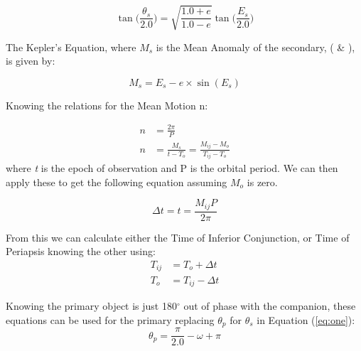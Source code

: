 \documentclass[12pt,preprint]{aastex}
\begin{document}
\begin{equation}
\tan\bigg( \frac{\theta_s}{2.0}  \bigg) = \sqrt{\frac{1.0+e}{1.0-e}} \tan\bigg( \frac{E_s}{2.0} \bigg)
\end{equation}

The Kepler's Equation, where $M_s$ is the Mean Anomaly of the secondary, (\citet{heintz} \& \citet{hilditch}), is given by:

\begin{equation}
M_s = E_s-e\times \sin(E_s)  
\end{equation}

Knowing the relations for the Mean Motion n:

\begin{subequations}
\begin{align}
n &= \frac{2\pi}{P}\\
n &=\frac{M_s}{t-T_o}=\frac{M_{ij}-M_{o}}{T_{ij}-T_o} 
\end{align}
\end{subequations}
where {\it t} is the epoch of observation and P is the orbital period.
We can then apply these to get the following equation assuming $M_{o}$ is zero.

\begin{equation}\label{eq:five}
\Delta t =t = \frac{M_{ij}P}{2\pi}
\end{equation}


From this we can calculate either the Time of Inferior Conjunction, or Time of Periapsis knowing the other using:
\begin{subequations}
\begin{align}
T_{ij} &= T_{o}+\Delta t\\
T_o &= T_{ij}-\Delta t
\end{align}
\end{subequations}



Knowing the primary object is just 180$^{\circ}$ out of phase with the companion, these equations can be used for the primary replacing $\theta_p$ for $\theta_s$ in Equation (\ref{eq:one}):
\begin{equation}
\theta_p = \frac{\pi}{2.0}-\omega+\pi
\end{equation}
\end{document}
